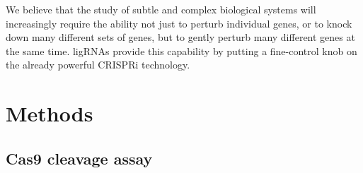 \documentclass[10pt,oneside]{article}
\begin{document}
% 
% 
% 
%


We believe that the study of subtle and complex biological systems will increasingly require the ability not just to perturb individual genes, or to knock down many different sets of genes, but to gently perturb many different genes at the same time.  ligRNAs provide this capability by putting a fine-control knob on the already powerful CRISPRi technology.

\section{Methods}
% 
% 
\subsection{\Invitro{} Cas9 cleavage assay}
\end{document}
